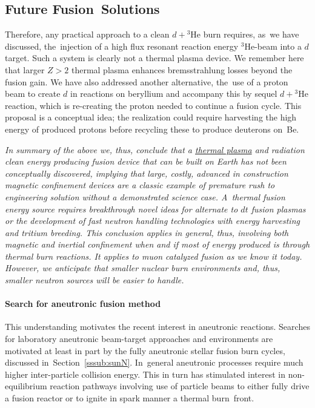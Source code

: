 \documentclass[particles,article,accept,pdftex,moreauthors]{Definitions/mdpi}
\begin{document}
\subsection{Future Fusion~Solutions}
Therefore, any practical approach to a clean $d+{}^3\mathrm{He}$ burn requires, as~we have discussed, the~injection of a high flux resonant reaction energy ${}^3\mathrm{He}$-beam into a $d$ target. Such a system is clearly not a thermal plasma device. We remember here that larger $Z>2$ thermal plasma enhances bremsstrahlung losses beyond the fusion gain. We have also addressed another alternative, the~use of a proton beam to create $d$ in reactions on beryllium and accompany this by sequel $d+{}^3\mathrm{He}$ reaction, which is re-creating the proton needed to continue a fusion cycle. This proposal is a conceptual idea; the realization could require harvesting the high energy of produced protons before recycling these to produce deuterons on~Be.

{\it In summary of the above we, thus, conclude that a \underline{thermal plasma} and radiation clean energy producing fusion device that can be built on Earth has not been conceptually discovered, implying that large, costly, advanced in construction magnetic confinement devices are a classic example of premature rush to engineering solution without a demonstrated science case. A~thermal fusion energy source requires breakthrough novel ideas for alternate to $dt$ fusion plasmas or the development of fast neutron handling technologies with energy harvesting and tritium breeding. This conclusion applies in general, thus, involving both magnetic and inertial confinement when and if most of energy produced is through thermal burn reactions. It applies to muon catalyzed fusion as we know it today. However, we anticipate that smaller nuclear burn environments and, thus, smaller neutron sources will be easier to handle.}

\vspace{-6pt}\paragraph*{\bf Search for aneutronic fusion method}
This understanding motivates the recent interest in aneutronic reactions. Searches for laboratory aneutronic beam-target approaches and environments are motivated at least in part by the fully aneutronic stellar fusion burn cycles, discussed in~Section~\ref{sssub:sunN}. In~general aneutronic processes require much higher inter-particle collision energy. This in turn has stimulated interest in non-equilibrium reaction pathways involving use of particle beams to either fully drive a fusion reactor or to ignite in spark manner a thermal burn~front. 
\end{document}
